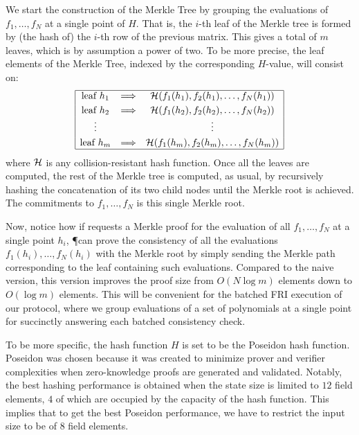 We start the construction of the Merkle Tree by grouping the evaluations of $f_1,\dots,f_N$ at a single point of $H$. That is, the $i$-th leaf of the Merkle tree is formed by (the hash of) the $i$-th row of the previous matrix. This gives a total of $m$ leaves, which is by assumption a power of two. To be more precise, the leaf elements of the Merkle Tree, indexed by the corresponding $H$-value, will consist on:
\[
\begin{array}{|ccc|}
\hline
\text{leaf } h_1 & \Longrightarrow & \mathcal{H}(f_1(h_1), f_2(h_1), \dots, f_N(h_1)) \\[0.1cm]
\text{leaf } h_2 & \Longrightarrow & \mathcal{H}(f_1(h_2), f_2(h_2), \dots, f_N(h_2)) \\
\vdots &  & \vdots \\[0.1cm]
\text{leaf } h_m & \Longrightarrow & \mathcal{H}(f_1(h_m), f_2(h_m), \dots, f_N(h_m)) \\
\hline
\end{array}
\]
where $\mathcal{H}$ is any collision-resistant hash function. Once all the leaves are computed, the rest of the Merkle tree is computed, as usual, by recursively hashing the concatenation of its two child nodes until the Merkle root is achieved. The commitments to $f_1,\dots,f_N$ is this single Merkle root. 

Now, notice how if \V requests a Merkle proof for the evaluation of all $f_1,\dots,f_N$ at a single point $h_i$, \P can prove the consistency of all the evaluations $f_1(h_i),\dots,f_N(h_i)$ with the Merkle root by simply sending the Merkle path corresponding to the leaf containing such evaluations. Compared to the naive version, this version improves the proof size from $O(N\log m)$ elements down to $O(\log m)$ elements. This will be convenient for the batched FRI execution of our protocol, where we group evaluations of a set of polynomials at a single point for succinctly answering each batched consistency check. 


\ifPOLYGON
To be more specific, the hash function $H$ is set to be the Poseidon \cite{USENIX:GKRRS21} hash function. Poseidon was chosen because it was created to minimize prover and verifier complexities when zero-knowledge proofs are generated and validated. Notably, the best hashing performance is obtained when the state size is limited to $12$ field elements, $4$ of which are occupied by the capacity of the hash function. This implies that to get the best Poseidon performance, we have to restrict the input size to be of $8$ field elements.

